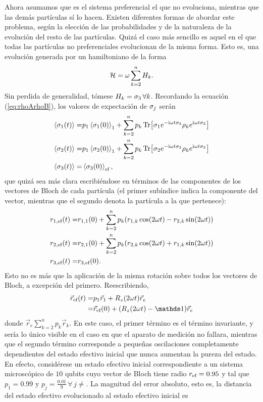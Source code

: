 Ahora asumamos que es el sistema preferencial el que no evoluciona, mientras que las demás partículas sí lo hacen. Existen diferentes formas de abordar este problema, según la elección de las probabilidades y de la naturaleza de la evolución del resto de las partículas. Quizá el caso más sencillo es aquel en el que todas las partículas no preferenciales evolucionan de la misma forma. Esto es, una evolución generada por un hamiltoniano de la forma
\begin{equation}
    \mathcal{H}=\omega \sum_{k=2}^{n}H_{k}.\nonumber
\end{equation}
Sin perdida de generalidad, tómese $H_{k}=\sigma_{3}\,\forall k$. Recordando la ecuación (\ref{eq:rhoArhoB}), los valores de expectación de $\sigma_{j}$ serán
\begin{align}
    \expval{\sigma_{1}(t)}=&p_{1} \expval{\sigma_{1}(0)}_{1}+\sum_{k=2}^{n}p_{k}\Tr[\sigma_{1}e^{-\text{i}\omega t\sigma_{3}} \rho_{k} e^{\text{i}\omega t\sigma_{3}}]\nonumber\\
    \expval{\sigma_{2}(t)}=&p_{1} \expval{\sigma_{2}(0)}_{1}+\sum_{k=2}^{n}p_{k}\Tr[\sigma_{2}e^{-\text{i}\omega t\sigma_{3}} \rho_{k} e^{\text{i}\omega t\sigma_{3}}]\nonumber\\
    \expval{\sigma_{3}(t)}=&\expval{\sigma_{3}(0)}_{\text{ef}},\nonumber
\end{align}
que quizá sea más clara escribiéndose en términos de las componentes de los vectores de Bloch de cada partícula (el primer subíndice indica la componente del vector, mientras que el segundo denota la partícula a la que pertenece):
\begin{align}
    r_{1,\text{ef}}(t)=&r_{1,1}(0)+\sum_{k=2}^{n}p_{k}(r_{1,k}\cos(2\omega t)-r_{2,k}\sin(2\omega t))\nonumber\\
    r_{2,\text{ef}}(t)=&r_{2,1}(0)+\sum_{k=2}^{n}p_{k}(r_{2,k}\cos(2\omega t)+r_{1,k}\sin(2\omega t))\nonumber\\
    r_{3,\text{ef}}(t)=&r_{3,\text{ef}}(0).\nonumber
\end{align}
Esto no es más que la aplicación de la misma rotación sobre todos los vectores de Bloch, a excepción del primero. Reescribiendo,
\begin{align}
    \vec{r}_{\ef}(t)=&p_{1}\vec{r}_{1}+R_{z}(2\omega t)\vec{r}_{e}\nonumber\\
    =&\vec{r}_{\ef}(0)+(R_{z}(2\omega t)-\Id)\vec{r}_{e}\nonumber
\end{align}
donde $\vec{r}_{e}\sum_{k=2}^{n}p_{k}\vec{r}_{k}$.
En este caso, el primer término es el término invariante, y sería lo único visible en el caso en que el aparato de medición no fallara, mientras que el segundo término corresponde a pequeñas oscilaciones completamente dependientes del estado efectivo inicial que nunca aumentan la pureza del estado. En efecto, considérese un estado efectivo inicial correspondiente a un sistema microscópico de $10$ qubits cuyo vector de Bloch tiene radio $r_{\text{ef}}=0.95$ y tal que $p_{1}=0.99$ y $p_{j}=\frac{0.01}{9}\,\forall\,j\neq $. La magnitud del error absoluto, esto es, la distancia del estado efectivo evolucionado al estado efectivo inicial es
